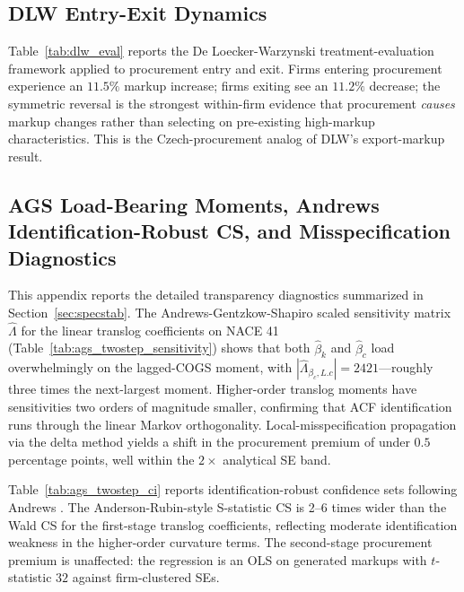 \documentclass[11pt]{article}
\begin{document}


\subsection{DLW Entry-Exit Dynamics}\label{app:dlw_eval}

Table~\ref{tab:dlw_eval} reports the De Loecker-Warzynski \cite{DLW2012} treatment-evaluation framework applied to procurement entry and exit. Firms entering procurement experience an $11.5\%$ markup increase; firms exiting see an $11.2\%$ decrease; the symmetric reversal is the strongest within-firm evidence that procurement \emph{causes} markup changes rather than selecting on pre-existing high-markup characteristics. This is the Czech-procurement analog of DLW's export-markup result.



\subsection{AGS Load-Bearing Moments, Andrews Identification-Robust CS, and Misspecification Diagnostics}\label{app:ags_detail}

This appendix reports the detailed transparency diagnostics summarized in Section~\ref{sec:specstab}. The Andrews-Gentzkow-Shapiro \cite{AGS2017} scaled sensitivity matrix $\hat\Lambda$ for the linear translog coefficients on NACE 41 (Table~\ref{tab:ags_twostep_sensitivity}) shows that both $\hat\beta_k$ and $\hat\beta_c$ load overwhelmingly on the lagged-COGS moment, with $|\hat\Lambda_{\beta_c, L.c}| = 2421$---roughly three times the next-largest moment. Higher-order translog moments have sensitivities two orders of magnitude smaller, confirming that ACF identification runs through the linear Markov orthogonality. Local-misspecification propagation via the delta method yields a shift in the procurement premium of under $0.5$ percentage points, well within the $2\times$ analytical SE band.



Table~\ref{tab:ags_twostep_ci} reports identification-robust confidence sets following Andrews \cite{Andrews2017ECMA}. The Anderson-Rubin-style S-statistic CS is 2--6 times wider than the Wald CS for the first-stage translog coefficients, reflecting moderate identification weakness in the higher-order curvature terms. The second-stage procurement premium is unaffected: the regression is an OLS on generated markups with $t$-statistic $32$ against firm-clustered SEs.
\end{document}
